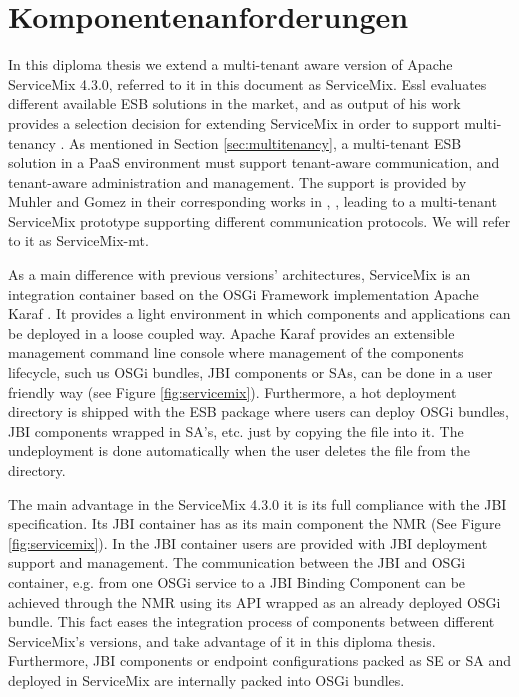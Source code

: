 \section{Komponentenanforderungen}
\label{sec:Komponentenanforderungen}  

In this diploma thesis we extend a multi-tenant aware version of Apache ServiceMix 4.3.0, referred to it in this document as ServiceMix. Essl evaluates different available \ac{ESB} solutions in the market, and as output of his work provides a selection decision for extending ServiceMix in order to support multi-tenancy \cite{Essl2011}. As mentioned in Section \ref{sec:multitenancy}, a multi-tenant \ac{ESB} solution in a \ac{PaaS} environment must support tenant-aware communication, and tenant-aware administration and management. The support is provided by Muhler and Gomez in their corresponding works in \cite{Muhler2012}, \cite{gomez2012}, leading to a multi-tenant ServiceMix prototype supporting different communication protocols. We will refer to it as ServiceMix-mt.

As a main difference with previous versions' architectures, ServiceMix is an integration container based on the \ac{OSGi} Framework implementation Apache Karaf  \cite{Karaf2011}. It provides a light environment in which components and applications can be deployed in a loose coupled way. Apache Karaf provides an extensible management command line console where management of the components lifecycle, such us \ac{OSGi} bundles, \ac{JBI} components or \ac{SA}s, can be done in a user friendly way (see Figure \ref{fig:servicemix}). Furthermore, a hot deployment directory is shipped with the \ac{ESB} package where users can deploy \ac{OSGi} bundles, \ac{JBI} components wrapped in \ac{SA}'s, etc. just by copying the file into it. The undeployment is done automatically when the user deletes the file from the  directory. 

The main advantage in the ServiceMix 4.3.0 it is its full compliance with the \ac{JBI} specification. Its \ac{JBI} container has as its main component the \ac{NMR} (See Figure \ref{fig:servicemix}). In the \ac{JBI} container users are provided with \ac{JBI} deployment support and management. The communication between the \ac{JBI} and \ac{OSGi} container, e.g. from one \ac{OSGi} service to a \ac{JBI} Binding Component can be achieved through the \ac{NMR} using its API wrapped as an already deployed \ac{OSGi} bundle. This fact eases the integration process of components between different ServiceMix's versions, and take advantage of it in this diploma thesis. Furthermore, \ac{JBI} components or endpoint configurations packed as \ac{SE} or \ac{SA} and deployed in ServiceMix are internally packed into \ac{OSGi} bundles. 

